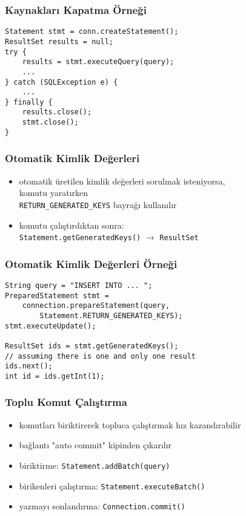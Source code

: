 \documentclass[dvipsnames]{beamer}
\theoremstyle{definition}
\theoremstyle{example}
\theoremstyle{plain}
\begin{document}
\begin{frame}[fragile]
  \frametitle{Kaynakları Kapatma Örneği}

  \begin{block}{}
    \begin{lstlisting}
Statement stmt = conn.createStatement();
ResultSet results = null;
try {
    results = stmt.executeQuery(query);
    ...
} catch (SQLException e) {
    ...
} finally {
    results.close();
    stmt.close();
}
    \end{lstlisting}
  \end{block}
\end{frame}

\begin{frame}
  \frametitle{Otomatik Kimlik Değerleri}

  \begin{itemize}
    \item otomatik üretilen kimlik değerleri sorulmak isteniyorsa,\\
      komutu yaratırken\\
      \lstinline!RETURN_GENERATED_KEYS! bayrağı kullanılır
    \item komutu çalıştırdıktan sonra:\\
      \lstinline!Statement.getGeneratedKeys()! $\rightarrow$
      \lstinline!ResultSet!
  \end{itemize}
\end{frame}

\begin{frame}[fragile]
  \frametitle{Otomatik Kimlik Değerleri Örneği}

  \begin{block}{}
    \begin{lstlisting}
String query = "INSERT INTO ... ";
PreparedStatement stmt =
    connection.prepareStatement(query,
        Statement.RETURN_GENERATED_KEYS);
stmt.executeUpdate();

ResultSet ids = stmt.getGeneratedKeys();
// assuming there is one and only one result
ids.next();
int id = ids.getInt(1);
    \end{lstlisting}
  \end{block}
\end{frame}

\begin{frame}
  \frametitle{Toplu Komut Çalıştırma}

  \begin{itemize}
    \item komutları biriktirerek topluca çalıştırmak hız kazandırabilir

    \pause
    \medskip
    \item bağlantı "auto commit" kipinden çıkarılır
    \item biriktirme: \lstinline!Statement.addBatch(query)!
    \item birikenleri çalıştırma: \lstinline!Statement.executeBatch()!
    \item yazmayı sonlandırma: \lstinline!Connection.commit()!
  \end{itemize}
\end{frame}
\end{document}
